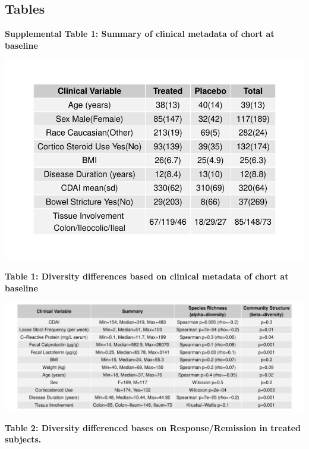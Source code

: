 \documentclass[11pt,]{article}
\begin{document}
\newpage

\subsection{Tables}\label{tables}

\textbf{Supplemental Table 1: Summary of clinical metadata of chort at
baseline}

\includegraphics{tables/SupTable1_baseline_metadata.pdf}

\newpage

\textbf{Table 1: Diversity differences based on clinical metadata of
chort at baseline}

\includegraphics{tables/table1_cohortdiversity.pdf}

\newpage

\textbf{Table 2: Diversity differenced bases on Response/Remission in
treated subjects.}
\end{document}
